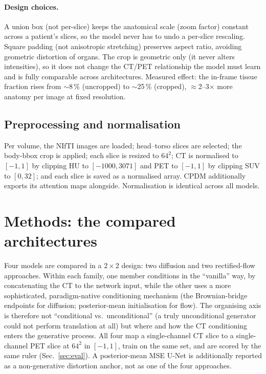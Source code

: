 \documentclass[11pt,a4paper]{article}
\newcommand{\num}[1]{#1}
\begin{document}
\paragraph{Design choices.} A union box (not per-slice) keeps the anatomical
scale (zoom factor) constant across a patient's slices, so the model never has to undo
a per-slice rescaling. Square padding (not anisotropic stretching) preserves
aspect ratio, avoiding geometric distortion of organs. The crop is geometric
only (it never alters intensities), so it does not change the CT/PET relationship
the model must learn and is fully comparable across architectures. Measured effect: the
in-frame tissue fraction rises from $\sim$\num{8}\,\% (uncropped) to $\sim$\num{25}\,\%
(cropped), $\approx$2--3$\times$ more anatomy per image at fixed resolution.

\subsection{Preprocessing and normalisation}
Per volume, the NIfTI images are loaded; head--torso slices are selected; the body-bbox crop
is applied; each slice is resized to $64^2$; CT is normalised to $[-1,1]$ by clipping HU to
$[-1000,3071]$ and PET to $[-1,1]$ by clipping SUV to $[0,32]$; and each slice is saved as a
normalised array. CPDM additionally exports its attention maps alongside. Normalisation is
identical across all models.

\section{Methods: the compared architectures}
\label{sec:methods}

Four models are compared in a $2\times2$ design: two diffusion and two
rectified-flow approaches. Within each family, one member conditions in the
``vanilla'' way, by concatenating the CT to the network input, while the
other uses a more sophisticated, paradigm-native conditioning mechanism (the
Brownian-bridge endpoints for diffusion; posterior-mean
initialisation for flow). The organising axis is therefore not ``conditional vs.\
unconditional'' (a truly unconditional generator could not perform translation at all)
but where and how the CT conditioning enters the generative process. All four map
a single-channel CT slice to a single-channel PET slice at $64^2$ in $[-1,1]$, train on
the same set, and are scored by the same ruler (Sec.~\ref{sec:eval}). A posterior-mean
MSE U-Net is additionally reported as a non-generative distortion anchor, not as
one of the four approaches.
\end{document}
